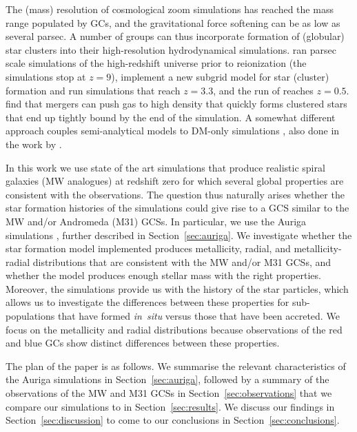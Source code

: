 \documentclass[a4paper,fleqn,usenatbib]{mnras}
\begin{document}
The (mass) resolution of cosmological zoom simulations has reached the mass range 
populated by GCs, and the gravitational force softening can be as low as several 
parsec. A number of groups can thus incorporate formation of (globular) star 
clusters into their high-resolution hydrodynamical simulations. \citet{2016ApJ...831..204R} 
ran parsec scale simulations of the high-redshift universe 
prior to reionization (the simulations stop at $z=9$), \citet{2017ApJ...834...69L} 
implement a new subgrid model for star (cluster) formation and run simulations 
that reach $z=3.3$, and the run of \citet{2017MNRAS.465.3622R} reaches $z=0.5$. 
\citet{2018MNRAS.474.4232K} find that mergers can push gas to high density that
quickly forms clustered stars that end up tightly bound by the end of the 
simulation. A somewhat different approach couples semi-analytical models to DM-only
simulations \citep{2010ApJ...718.1266M,2014ApJ...796...10L,2018MNRAS.480.2343C,
2019MNRAS.486..331C,2019MNRAS.488.5409C}, also done in the work by 
\citet{2019MNRAS.482.4528E}.

In this work we use state of the art simulations that produce realistic spiral 
galaxies (MW analogues) at redshift zero for which several global properties 
are consistent with the observations. The question thus naturally arises whether 
the star formation histories of the simulations could give rise to a GCS similar to 
the MW and/or Andromeda (M31) GCSs. In particular, 
we use the Auriga simulations \citep[][hereafter G17]{2017MNRAS.467..179G}, 
further described in Section~\ref{sec:auriga}. We investigate whether the star 
formation model implemented produces metallicity, radial, and metallicity-radial 
distributions that are consistent with the MW and/or M31 GCSs, and whether the 
model produces enough stellar mass with the right properties. Moreover, the simulations
provide us with the history of the star particles, which allows us to investigate
the differences between these properties for sub-populations that have formed 
{\it in~situ} versus those that have been accreted. We focus on the metallicity
and radial distributions because observations of the red and blue GCs show
distinct differences between these properties.

The plan of the paper is as follows. We summarise the relevant characteristics 
of the Auriga simulations in Section~\ref{sec:auriga}, followed by a summary of 
the observations of the MW and M31 GCSs
in Section~\ref{sec:observations} that we compare our simulations to in
Section~\ref{sec:results}. We discuss our findings in Section~\ref{sec:discussion}
to come to our conclusions in Section~\ref{sec:conclusions}.
\end{document}
